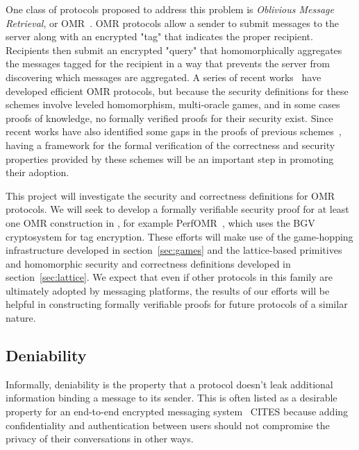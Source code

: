 One class of protocols proposed to address this problem is {\em Oblivious Message Retrieval}, or OMR~\cite{}.  
OMR protocols allow a sender to submit messages to the server along with an encrypted "tag" that indicates the proper recipient.  
Recipients then submit an encrypted "query" that homomorphically aggregates the messages tagged for the recipient in a way that prevents the server from discovering which messages are aggregated.  
A series of recent works~\cite{} have developed efficient OMR protocols, but because the security definitions for these schemes involve leveled homomorphism, multi-oracle games, and in some cases proofs of knowledge, no formally verified proofs for their security exist.  
Since recent works have also identified some gaps in the proofs of previous schemes~\cite{snake}, having a framework for the formal verification of the correctness and security properties provided by these schemes will be an important step in promoting their adoption.

This project will investigate the security and correctness definitions for OMR protocols.  
We will seek to develop a formally verifiable security proof for at least one OMR construction in \vcvio, for example PerfOMR~\cite{}, which uses the BGV~\cite{BGV} cryptosystem for tag encryption. 
These efforts will make use of the game-hopping infrastructure developed in section~\ref{sec:games} and the lattice-based primitives and homomorphic security and correctness definitions developed in section~\ref{sec:lattice}.
We expect that even if other protocols in this family are ultimately adopted by messaging platforms, the results of our efforts will be helpful in constructing formally verifiable proofs for future protocols of a similar nature.

\subsection{Deniability}\label{sec:deniability}

Informally, deniability is the property that a protocol doesn't leak additional information binding a message to its sender.
This is often listed as a desirable property for an end-to-end encrypted messaging system~\cite{OTR,others...} CITES because adding confidentiality and authentication between users should not compromise the privacy of their conversations in other ways.

